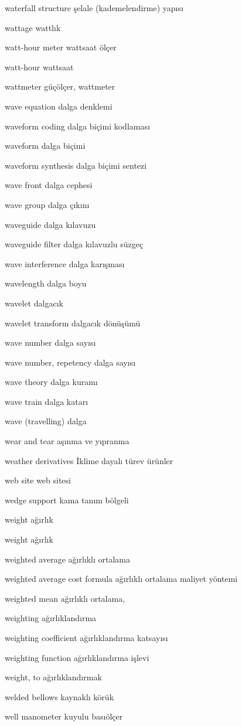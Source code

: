 \documentclass[12pt,fleqn]{article}\usepackage{../../common}
\begin{document}
waterfall structure şelale (kademelendirme) yapısı

wattage wattlık

watt-hour meter wattsaat ölçer

watt-hour wattsaat

wattmeter güçölçer, wattmeter

wave equation dalga denklemi

waveform coding dalga biçimi kodlaması

waveform dalga biçimi

waveform synthesis dalga biçimi sentezi

wave front dalga cephesi

wave group dalga çıkını

waveguide dalga kılavuzu

waveguide filter dalga kılavuzlu süzgeç

wave interference dalga karışması

wavelength dalga boyu

wavelet dalgacık

wavelet transform dalgacık dönüşümü

wave number dalga sayısı

wave number, repetency dalga sayısı

wave theory dalga kuramı

wave train dalga katarı

wave (travelling) dalga

wear and tear aşınma ve yıpranma

weather derivatives İklime dayalı türev ürünler

web site web sitesi

wedge support kama tanım bölgeli

weight ağırlık

weight ağırlık

weighted average ağırlıklı ortalama

weighted average cost formula ağırlıklı ortalama maliyet yöntemi

weighted mean ağırlıklı ortalama,

weighting ağırlıklandırma

weighting coefficient ağırlıklandırma katsayısı

weighting function ağırlıklandırma işlevi

weight, to ağırlıklandırmak

welded bellows kaynaklı körük

well manometer kuyulu basıölçer
\end{document}
